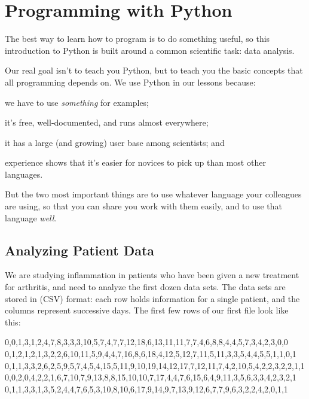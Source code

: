 \chapter{Programming with Python}\label{s:python}

The best way to learn how to program is to do something useful, so this
introduction to Python is built around a common scientific task: data
analysis.

Our real goal isn't to teach you Python, but to teach you the basic
concepts that all programming depends on. We use Python in our lessons
because:

\begin{swcenumerate}
\item
  we have to use \emph{something} for examples;
\item
  it's free, well-documented, and runs almost everywhere;
\item
  it has a large (and growing) user base among scientists; and
\item
  experience shows that it's easier for novices to pick up than most
  other languages.
\end{swcenumerate}

But the two most important things are to use whatever language your
colleagues are using, so that you can share you work with them easily,
and to use that language \emph{well}.

\section{Analyzing Patient Data}

We are studying inflammation in patients who have been given a new
treatment for arthritis, and need to analyze the first dozen data sets.
The data sets are stored in 
(CSV) format: each row holds information for a single patient, and the
columns represent successive days. The first few rows of our first file
look like this:

\begin{VerbFile}
0,0,1,3,1,2,4,7,8,3,3,3,10,5,7,4,7,7,12,18,6,13,11,11,7,7,4,6,8,8,4,4,5,7,3,4,2,3,0,0
0,1,2,1,2,1,3,2,2,6,10,11,5,9,4,4,7,16,8,6,18,4,12,5,12,7,11,5,11,3,3,5,4,4,5,5,1,1,0,1
0,1,1,3,3,2,6,2,5,9,5,7,4,5,4,15,5,11,9,10,19,14,12,17,7,12,11,7,4,2,10,5,4,2,2,3,2,2,1,1
0,0,2,0,4,2,2,1,6,7,10,7,9,13,8,8,15,10,10,7,17,4,4,7,6,15,6,4,9,11,3,5,6,3,3,4,2,3,2,1
0,1,1,3,3,1,3,5,2,4,4,7,6,5,3,10,8,10,6,17,9,14,9,7,13,9,12,6,7,7,9,6,3,2,2,4,2,0,1,1
\end{VerbFile}

